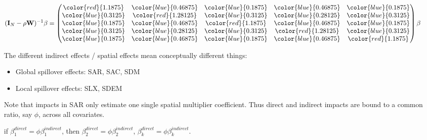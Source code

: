 \documentclass[
  letterpaper,
]{scrbook}
\begin{document}
\[
\begin{split}
(\boldsymbol{\mathbf{I}}_N - \rho \boldsymbol{\mathbf{W}})^{-1} \beta &=
\begin{pmatrix}
      \color{red}{1.1875} & \color{blue}{0.46875} & \color{blue}{0.1875} & \color{blue}{0.46875} & \color{blue}{0.1875} \\
      \color{blue}{0.3125} & \color{red}{1.28125} & \color{blue}{0.3125} & \color{blue}{0.28125} & \color{blue}{0.3125} \\
      \color{blue}{0.1875} & \color{blue}{0.46875} & \color{red}{1.1875} & \color{blue}{0.46875} & \color{blue}{0.1875} \\
      \color{blue}{0.3125} & \color{blue}{0.28125} & \color{blue}{0.3125} & \color{red}{1.28125} & \color{blue}{0.3125} \\
      \color{blue}{0.1875} & \color{blue}{0.46875} & \color{blue}{0.1875} & \color{blue}{0.46875} & \color{red}{1.1875}
      \end{pmatrix} \beta
\end{split}
\]

The different indirect effects / spatial effects mean conceptually
different things:

\begin{itemize}
\item
  Global spillover effects: SAR, SAC, SDM
\item
  Local spillover effects: SLX, SDEM
\end{itemize}

\begin{tcolorbox}[enhanced jigsaw, colframe=quarto-callout-warning-color-frame, coltitle=black, titlerule=0mm, opacitybacktitle=0.6, toprule=.15mm, colbacktitle=quarto-callout-warning-color!10!white, toptitle=1mm, leftrule=.75mm, colback=white, bottomtitle=1mm, opacityback=0, left=2mm, title=\textcolor{quarto-callout-warning-color}{\faExclamationTriangle}\hspace{0.5em}{Common ratio between direct and indirect impacts in SAR and SAC}, breakable, arc=.35mm, rightrule=.15mm, bottomrule=.15mm]

Note that impacts in SAR only estimate one single spatial multiplier
coefficient. Thus direct and indirect impacts are bound to a common
ratio, say \(\phi\), across all covariates.

if \(\beta_1^{direct} = \phi\beta_1^{indirect}\), then
\(\beta_2^{direct} = \phi\beta_2^{indirect}\),
\(\beta_k^{direct} = \phi\beta_k^{indirect}\).

\end{tcolorbox}
\end{document}
